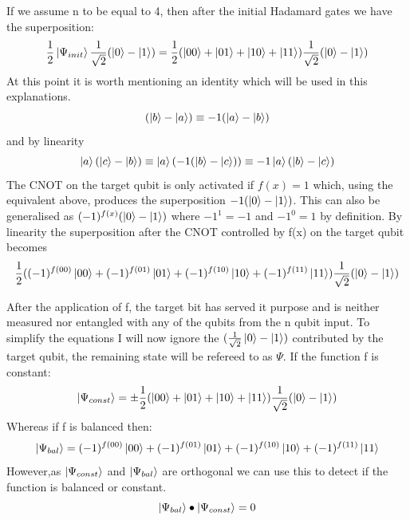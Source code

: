 \documentclass[authoryearcitations]{UoYCSproject}
\begin{document}
If we assume n to be equal to 4, then after the initial Hadamard gates we have the superposition:
\begin{equation}
\frac{1}{2}\left\vert{\Psi_{init}}\right\rangle\frac{1}{\sqrt{2}}(\left\vert{0}\right\rangle-\left\vert{1}\right\rangle)=\frac{1}{2}(\left\vert{00}\right\rangle+\left\vert{01}\right\rangle+\left\vert{10}\right\rangle+\left\vert{11}\right\rangle)\frac{1}{\sqrt{2}}(\left\vert{0}\right\rangle-\left\vert{1}\right\rangle)
\end{equation}
At this point it is worth mentioning an identity which will be used in this explanations.
\begin{equation}
(\left\vert{b}\right\rangle-\left\vert{a}\right\rangle)\equiv-1(\left\vert{a}\right\rangle-\left\vert{b}\right\rangle)
\end{equation}
and by linearity
\begin{equation}
\left\vert{a}\right\rangle(\left\vert{c}\right\rangle-\left\vert{b}\right\rangle)\equiv\left\vert{a}\right\rangle(-1(\left\vert{b}\right\rangle-\left\vert{c}\right\rangle))\equiv-1\left\vert{a}\right\rangle(\left\vert{b}\right\rangle-\left\vert{c}\right\rangle)
\label{target_qubit_identity}
\end{equation}
The CNOT on the target qubit is only activated if $f(x)=1$ which, using the equivalent above, produces the superposition $-1(\left\vert{0}\right\rangle-\left\vert{1}\right\rangle)$.
This can also be generalised as $(-1)^{f(x)}(\left\vert{0}\right\rangle-\left\vert{1}\right\rangle)$ where $-1^1=-1$ and $-1^0=1$ by definition.
By linearity the superposition after the CNOT controlled by f(x) on the target qubit becomes
\begin{equation}
\frac{1}{2}((-1)^{f(00)}\left\vert{00}\right\rangle+(-1)^{f(01)}\left\vert{01}\right\rangle+(-1)^{f(10)}\left\vert{10}\right\rangle+(-1)^{f(11)}\left\vert{11}\right\rangle)\frac{1}{\sqrt{2}}(\left\vert{0}\right\rangle-\left\vert{1}\right\rangle)
\end{equation}

After the application of f, the target bit has served it purpose and is neither measured nor entangled with any of the qubits from the n qubit input.
To simplify the equations I will now ignore the $(\frac{1}{\sqrt{2}}\left\vert{0}\right\rangle-\left\vert{1}\right\rangle)$ contributed by the target qubit, the remaining state will be refereed to as $\Psi$.
If the function f is constant:
\begin{equation}
\left\vert{\Psi_{const}}\right\rangle=\pm\frac{1}{2}(\left\vert{00}\right\rangle+\left\vert{01}\right\rangle+\left\vert{10}\right\rangle+\left\vert{11}\right\rangle)\frac{1}{\sqrt{2}}(\left\vert{0}\right\rangle-\left\vert{1}\right\rangle)
\end{equation}
Whereas if f is balanced then:
\begin{equation}
\left\vert{\Psi_{bal}}\right\rangle=(-1)^{f(00)}\left\vert{00}\right\rangle+(-1)^{f(01)}\left\vert{01}\right\rangle+(-1)^{f(10)}\left\vert{10}\right\rangle+(-1)^{f(11)}\left\vert{11}\right\rangle
\end{equation}
However,as $\left\vert{\Psi_{const}}\right\rangle$ and $\left\vert{\Psi_{bal}}\right\rangle$ are orthogonal we can use this to detect if the function is balanced or constant.
\begin{equation}
\left\vert{\Psi_{bal}}\right\rangle\bullet\left\vert{\Psi_{const}}\right\rangle = 0
\end{equation}
\end{document}
